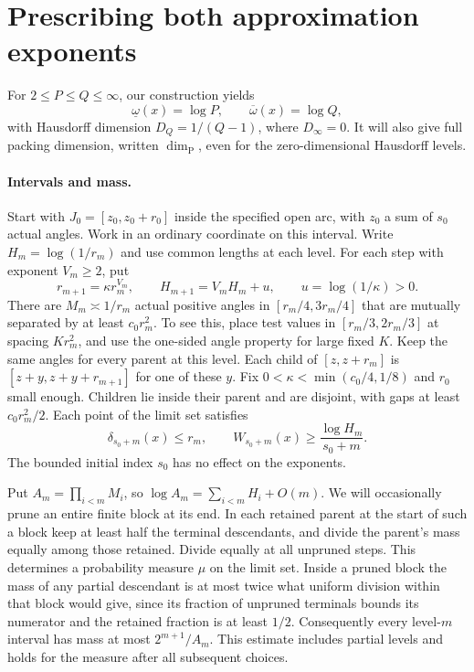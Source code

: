 \documentclass[11pt]{article}
\newcommand{\upexp}{\overline\omega}
\newcommand{\lowexp}{\underline\omega}
\begin{document}
\section{Prescribing both approximation exponents}
For $2\le P\le Q\le\infty$, our construction yields
\begin{equation}\label{geom}
 \lowexp(x)=\log P,\qquad \upexp(x)=\log Q,
\end{equation}
with Hausdorff dimension $D_Q=1/(Q-1)$, where $D_\infty=0$. It will also give full packing dimension, written $\dim_{\mathrm P}$, even for the zero-dimensional Hausdorff levels.

\paragraph{Intervals and mass.}
Start with $J_0=[z_0,z_0+r_0]$ inside the specified open arc, with $z_0$ a sum of $s_0$ actual angles. Work in an ordinary coordinate on this interval. Write $H_m=\log(1/r_m)$ and use common lengths at each level. For each step with exponent $V_m\ge2$, put
\[
 r_{m+1}=\kappa r_m^{V_m},\qquad H_{m+1}=V_m H_m+u,\qquad u=\log(1/\kappa)>0.
\]
There are $M_m\asymp1/r_m$ actual positive angles in $[r_m/4,3r_m/4]$ that are mutually separated by at least $c_0r_m^2$. To see this, place test values in $[r_m/3,2r_m/3]$ at spacing $K r_m^2$, and use the one-sided angle property for large fixed $K$. Keep the same angles for every parent at this level. Each child of $[z,z+r_m]$ is $[z+y,z+y+r_{m+1}]$ for one of these $y$. Fix $0<\kappa<\min(c_0/4,1/8)$ and $r_0$ small enough. Children lie inside their parent and are disjoint, with gaps at least $c_0r_m^2/2$. Each point of the limit set satisfies
\begin{equation}\label{treeapprox}
 \delta_{s_0+m}(x)\le r_m,\qquad
 W_{s_0+m}(x)\ge\frac{\log H_m}{s_0+m}.
\end{equation}
The bounded initial index $s_0$ has no effect on the exponents.

Put $A_m=\prod_{i<m}M_i$, so $\log A_m=\sum_{i<m}H_i+O(m)$. We will occasionally prune an entire finite block at its end. In each retained parent at the start of such a block keep at least half the terminal descendants, and divide the parent's mass equally among those retained. Divide equally at all unpruned steps. This determines a probability measure $\mu$ on the limit set. Inside a pruned block the mass of any partial descendant is at most twice what uniform division within that block would give, since its fraction of unpruned terminals bounds its numerator and the retained fraction is at least $1/2$. Consequently every level-$m$ interval has mass at most $2^{m+1}/A_m$. This estimate includes partial levels and holds for the measure after all subsequent choices.
\end{document}
